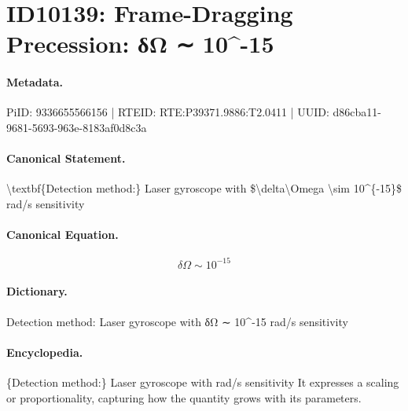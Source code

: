 \section*{ID10139: Frame-Dragging Precession: δΩ ∼ 10\textasciicircum{}-15}
\paragraph{Metadata.}
PiID: 9336655566156 | RTEID: RTE:P39371.9886:T2.0411 | UUID: d86cba11-9681-5693-963e-8183af0d8c3a

\paragraph{Canonical Statement.}
\textbackslash{}textbf\{Detection method:\} Laser gyroscope with \$\textbackslash{}delta\textbackslash{}Omega \textbackslash{}sim 10\textasciicircum{}\{-15\}\$ rad/s sensitivity

\paragraph{Canonical Equation.}
\[
\delta\Omega \sim 10^{-15}
\]

\paragraph{Dictionary.}
Detection method: Laser gyroscope with δΩ ∼ 10\textasciicircum{}-15 rad/s sensitivity

\paragraph{Encyclopedia.}
\{Detection method:\} Laser gyroscope with rad/s sensitivity It expresses a scaling or proportionality, capturing how the quantity grows with its parameters.
